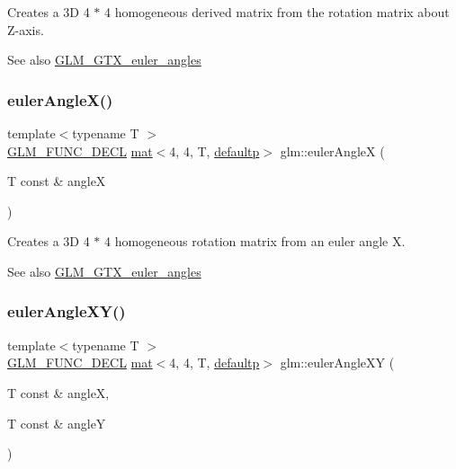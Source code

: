 Creates a 3D 4 $\ast$ 4 homogeneous derived matrix from the rotation matrix about Z-\/axis. \begin{DoxySeeAlso}{See also}
\mbox{\hyperlink{group__gtx__euler__angles}{G\+L\+M\+\_\+\+G\+T\+X\+\_\+euler\+\_\+angles}} 
\end{DoxySeeAlso}
\mbox{\label{group__gtx__euler__angles_gafba6282e4ed3ff8b5c75331abfba3489}} 
\subsubsection{\texorpdfstring{euler\+Angle\+X()}{eulerAngleX()}}
{\footnotesize\ttfamily template$<$typename T $>$ \\
\mbox{\hyperlink{setup_8hpp_ab2d052de21a70539923e9bcbf6e83a51}{G\+L\+M\+\_\+\+F\+U\+N\+C\+\_\+\+D\+E\+CL}} \mbox{\hyperlink{structglm_1_1mat}{mat}}$<$4, 4, T, \mbox{\hyperlink{namespaceglm_a36ed105b07c7746804d7fdc7cc90ff25a9d21ccd8b5a009ec7eb7677befc3bf51}{defaultp}}$>$ glm\+::euler\+AngleX (\begin{DoxyParamCaption}\item[{T const \&}]{angleX }\end{DoxyParamCaption})}

Creates a 3D 4 $\ast$ 4 homogeneous rotation matrix from an euler angle X. \begin{DoxySeeAlso}{See also}
\mbox{\hyperlink{group__gtx__euler__angles}{G\+L\+M\+\_\+\+G\+T\+X\+\_\+euler\+\_\+angles}} 
\end{DoxySeeAlso}
\mbox{\label{group__gtx__euler__angles_ga64036577ee17a2d24be0dbc05881d4e2}} 
\subsubsection{\texorpdfstring{euler\+Angle\+X\+Y()}{eulerAngleXY()}}
{\footnotesize\ttfamily template$<$typename T $>$ \\
\mbox{\hyperlink{setup_8hpp_ab2d052de21a70539923e9bcbf6e83a51}{G\+L\+M\+\_\+\+F\+U\+N\+C\+\_\+\+D\+E\+CL}} \mbox{\hyperlink{structglm_1_1mat}{mat}}$<$4, 4, T, \mbox{\hyperlink{namespaceglm_a36ed105b07c7746804d7fdc7cc90ff25a9d21ccd8b5a009ec7eb7677befc3bf51}{defaultp}}$>$ glm\+::euler\+Angle\+XY (\begin{DoxyParamCaption}\item[{T const \&}]{angleX,  }\item[{T const \&}]{angleY }\end{DoxyParamCaption})}

